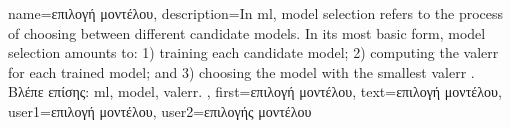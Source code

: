 {name={\foreignlanguage{greek}{επιλογή μοντέλου}},
	description={In \gls{ml}, \gls{model} selection refers to the 
		process of choosing between different candidate \gls{model}s. In its most 
		basic form, \gls{model} selection amounts to: 1) training each candidate \gls{model}; 
		2) computing the \gls{valerr} for each trained \gls{model}; and 3) choosing the \gls{model} 
		with the smallest \gls{valerr} \cite[Ch. 6]{MLBasics}.\\
		\foreignlanguage{greek}{Βλέπε επίσης:} \gls{ml}, \gls{model}, \gls{valerr}. },
	first={\foreignlanguage{greek}{επιλογή μοντέλου}},
	text={\foreignlanguage{greek}{επιλογή μοντέλου}},
	user1={\foreignlanguage{greek}{επιλογή μοντέλου}}, %
	user2={\foreignlanguage{greek}{επιλογής μοντέλου}} %
}

